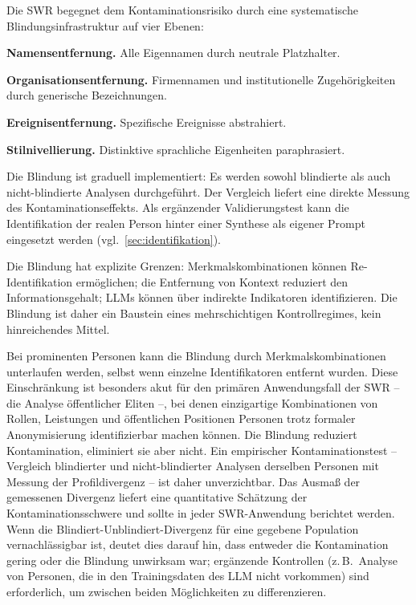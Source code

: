 \documentclass[11pt,a4paper]{article}
\theoremstyle{definition}
\theoremstyle{plain}
\theoremstyle{remark}
\begin{document}
Die SWR begegnet dem Kontaminationsrisiko durch eine systematische Blindungsinfrastruktur auf vier Ebenen:

\begin{description}[leftmargin=*,labelwidth=2.5cm]
  \item[Ebene 1:] \textbf{Namensentfernung.} Alle Eigennamen durch neutrale Platzhalter.
  \item[Ebene 2:] \textbf{Organisationsentfernung.} Firmennamen und institutionelle Zugeh\"origkeiten durch generische Bezeichnungen.
  \item[Ebene 3:] \textbf{Ereignisentfernung.} Spezifische Ereignisse abstrahiert.
  \item[Ebene 4:] \textbf{Stilnivellierung.} Distinktive sprachliche Eigenheiten paraphrasiert.
\end{description}

Die Blindung ist graduell implementiert: Es werden sowohl blindierte als auch nicht-blindierte Analysen durchgef\"uhrt. Der Vergleich liefert eine direkte Messung des Kontaminationseffekts. Als erg\"anzender Validierungstest kann die Identifikation der realen Person hinter einer Synthese als eigener Prompt eingesetzt werden (vgl.\ \ref{sec:identifikation}).

Die Blindung hat explizite Grenzen: Merkmalskombinationen k\"onnen Re-Identifikation erm\"oglichen; die Entfernung von Kontext reduziert den Informationsgehalt; LLMs k\"onnen \"uber indirekte Indikatoren identifizieren. Die Blindung ist daher ein Baustein eines mehrschichtigen Kontrollregimes, kein hinreichendes Mittel.

Bei prominenten Personen kann die Blindung durch Merkmalskombinationen unterlaufen werden, selbst wenn einzelne Identifikatoren entfernt wurden. Diese Einschr\"ankung ist besonders akut f\"ur den prim\"aren Anwendungsfall der SWR -- die Analyse \"offentlicher Eliten --, bei denen einzigartige Kombinationen von Rollen, Leistungen und \"offentlichen Positionen Personen trotz formaler Anonymisierung identifizierbar machen k\"onnen. Die Blindung reduziert Kontamination, eliminiert sie aber nicht. Ein empirischer Kontaminationstest -- Vergleich blindierter und nicht-blindierter Analysen derselben Personen mit Messung der Profildivergenz -- ist daher unverzichtbar. Das Ausma\ss{} der gemessenen Divergenz liefert eine quantitative Sch\"atzung der Kontaminationsschwere und sollte in jeder SWR-Anwendung berichtet werden. Wenn die Blindiert-Unblindiert-Divergenz f\"ur eine gegebene Population vernachl\"assigbar ist, deutet dies darauf hin, dass entweder die Kontamination gering oder die Blindung unwirksam war; erg\"anzende Kontrollen (z.\,B.\ Analyse von Personen, die in den Trainingsdaten des LLM nicht vorkommen) sind erforderlich, um zwischen beiden M\"oglichkeiten zu differenzieren.
\end{document}
